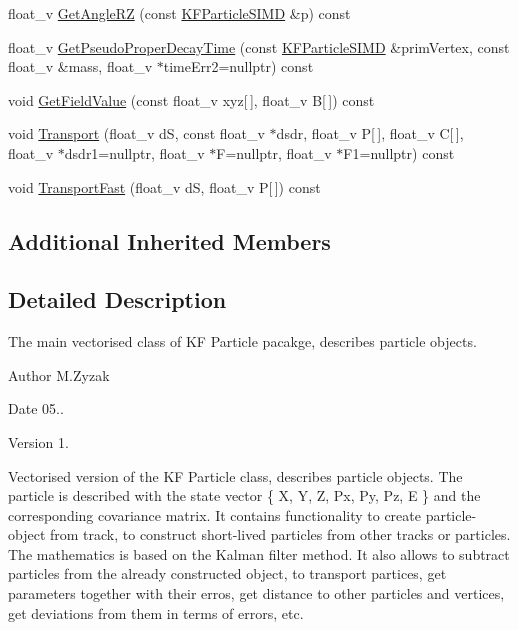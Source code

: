 \begin{DoxyCompactItemize}
\item 
float\+\_\+v \hyperlink{classKFParticleSIMD_acf26f94fdfb68a8983b0b601ae86a3ff}{Get\+Angle\+RZ} (const \hyperlink{classKFParticleSIMD}{K\+F\+Particle\+S\+I\+MD} \&p) const 
\item 
float\+\_\+v \hyperlink{classKFParticleSIMD_a97da667746e38c615d6652efcdb2d378}{Get\+Pseudo\+Proper\+Decay\+Time} (const \hyperlink{classKFParticleSIMD}{K\+F\+Particle\+S\+I\+MD} \&prim\+Vertex, const float\+\_\+v \&mass, float\+\_\+v $\ast$time\+Err2=nullptr) const 
\item 
void \hyperlink{classKFParticleSIMD_aa690422efc2940cb8b38280b592831d4}{Get\+Field\+Value} (const float\+\_\+v xyz\mbox{[}$\,$\mbox{]}, float\+\_\+v B\mbox{[}$\,$\mbox{]}) const 
\item 
void \hyperlink{classKFParticleSIMD_a30f4af6707803e1f959559db63fb620a}{Transport} (float\+\_\+v dS, const float\+\_\+v $\ast$dsdr, float\+\_\+v P\mbox{[}$\,$\mbox{]}, float\+\_\+v C\mbox{[}$\,$\mbox{]}, float\+\_\+v $\ast$dsdr1=nullptr, float\+\_\+v $\ast$F=nullptr, float\+\_\+v $\ast$F1=nullptr) const 
\item 
void \hyperlink{classKFParticleSIMD_a7fffef3f8325407951238797bfb3c8fc}{Transport\+Fast} (float\+\_\+v dS, float\+\_\+v P\mbox{[}$\,$\mbox{]}) const 
\end{DoxyCompactItemize}
\subsection*{Additional Inherited Members}


\subsection{Detailed Description}
The main vectorised class of KF Particle pacakge, describes particle objects. 

\begin{DoxyAuthor}{Author}
M.\+Zyzak 
\end{DoxyAuthor}
\begin{DoxyDate}{Date}
05.. 
\end{DoxyDate}
\begin{DoxyVersion}{Version}
1.
\end{DoxyVersion}
Vectorised version of the KF Particle class, describes particle objects. The particle is described with the state vector \{ X, Y, Z, Px, Py, Pz, E \} and the corresponding covariance matrix. It contains functionality to create particle-\/object from track, to construct short-\/lived particles from other tracks or particles. The mathematics is based on the Kalman filter method. It also allows to subtract particles from the already constructed object, to transport partices, get parameters together with their erros, get distance to other particles and vertices, get deviations from them in terms of errors, etc. 

